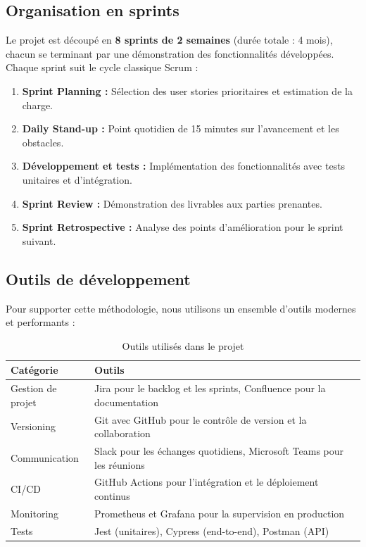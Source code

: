 \subsection*{Organisation en sprints}

Le projet est découpé en \textbf{8 sprints de 2 semaines} (durée totale : 4 mois), chacun se terminant par une démonstration des fonctionnalités développées. Chaque sprint suit le cycle classique Scrum :

\begin{enumerate}
    \item \textbf{Sprint Planning :} Sélection des user stories prioritaires et estimation de la charge.
    
    \item \textbf{Daily Stand-up :} Point quotidien de 15 minutes sur l'avancement et les obstacles.
    
    \item \textbf{Développement et tests :} Implémentation des fonctionnalités avec tests unitaires et d'intégration.
    
    \item \textbf{Sprint Review :} Démonstration des livrables aux parties prenantes.
    
    \item \textbf{Sprint Retrospective :} Analyse des points d'amélioration pour le sprint suivant.
\end{enumerate}

\subsection*{Outils de développement}

Pour supporter cette méthodologie, nous utilisons un ensemble d'outils modernes et performants :

\begin{table}[h]
\centering
\begin{tabularx}{\textwidth}{|l|X|}
\hline
\rowcolor{gray!20}
\textbf{Catégorie} & \textbf{Outils} \\
\hline
Gestion de projet & Jira pour le backlog et les sprints, Confluence pour la documentation \\
\hline
Versioning & Git avec GitHub pour le contrôle de version et la collaboration \\
\hline
Communication & Slack pour les échanges quotidiens, Microsoft Teams pour les réunions \\
\hline
CI/CD & GitHub Actions pour l'intégration et le déploiement continus \\
\hline
Monitoring & Prometheus et Grafana pour la supervision en production \\
\hline
Tests & Jest (unitaires), Cypress (end-to-end), Postman (API) \\
\hline
\end{tabularx}
\caption{Outils utilisés dans le projet}
\end{table}

